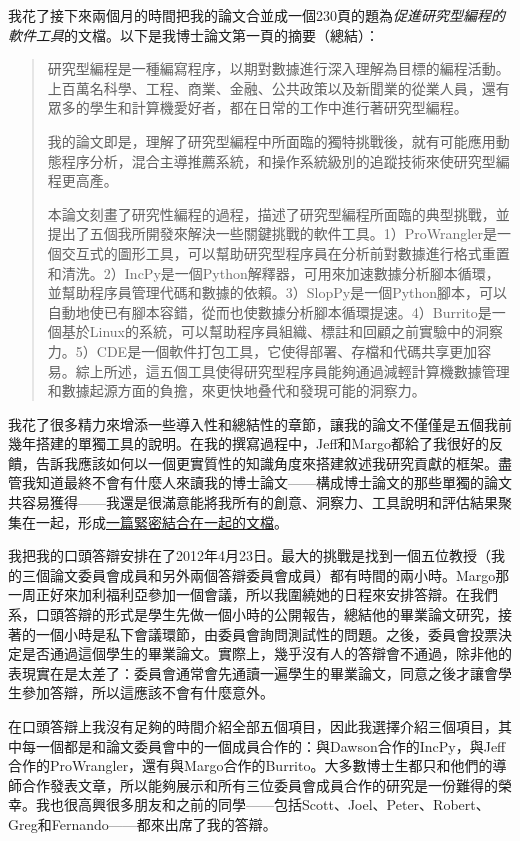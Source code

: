 \documentclass[12pt,UTF8,nofonts]{book}
\begin{document}
我花了接下來兩個月的時間把我的論文合並成一個230頁的題為\emph{促進研究型編程的軟件工具}的文檔。以下是我博士論文第一頁的摘要（總結）：
\begin{quote}
  研究型編程是一種編寫程序，以期對數據進行深入理解為目標的編程活動。上百萬名科學、工程、商業、金融、公共政策以及新聞業的從業人員，還有眾多的學生和計算機愛好者，都在日常的工作中進行著研究型編程。

  我的論文即是，理解了研究型編程中所面臨的獨特挑戰後，就有可能應用動態程序分析，混合主導推薦系統，和操作系統級別的追蹤技術來使研究型編程更高產。

  本論文刻畫了研究性編程的過程，描述了研究型編程所面臨的典型挑戰，並提出了五個我所開發來解決一些關鍵挑戰的軟件工具。1）ProWrangler是一個交互式的圖形工具，可以幫助研究型程序員在分析前對數據進行格式重置和清洗。2）IncPy是一個Python解釋器，可用來加速數據分析腳本循環，並幫助程序員管理代碼和數據的依賴。3）SlopPy是一個Python腳本，可以自動地使已有腳本容錯，從而也使數據分析腳本循環提速。4）Burrito是一個基於Linux的系統，可以幫助程序員組織、標註和回顧之前實驗中的洞察力。5）CDE是一個軟件打包工具，它使得部署、存檔和代碼共享更加容易。綜上所述，這五個工具使得研究型程序員能夠通過減輕計算機數據管理和數據起源方面的負擔，來更快地叠代和發現可能的洞察力。
\end{quote}
我花了很多精力來增添一些導入性和總結性的章節，讓我的論文不僅僅是五個我前幾年搭建的單獨工具的說明。在我的撰寫過程中，Jeff和Margo都給了我很好的反饋，告訴我應該如何以一個更實質性的知識角度來搭建敘述我研究貢獻的框架。盡管我知道最終不會有什麼人來讀我的博士論文——構成博士論文的那些單獨的論文共容易獲得——我還是很滿意能將我所有的創意、洞察力、工具說明和評估結果聚集在一起，形成\href{http://www.pgbovine.net/projects/pubs/guo_phd_dissertation.pdf}{一篇緊密結合在一起的文檔}。

\breakline

我把我的口頭答辯安排在了2012年4月23日。最大的挑戰是找到一個五位教授（我的三個論文委員會成員和另外兩個答辯委員會成員）都有時間的兩小時。Margo那一周正好來加利福利亞參加一個會議，所以我圍繞她的日程來安排答辯。在我們系，口頭答辯的形式是學生先做一個小時的公開報告，總結他的畢業論文研究，接著的一個小時是私下會議環節，由委員會詢問測試性的問題。之後，委員會投票決定是否通過這個學生的畢業論文。實際上，幾乎沒有人的答辯會不通過，除非他的表現實在是太差了：委員會通常會先通讀一遍學生的畢業論文，同意之後才讓會學生參加答辯，所以這應該不會有什麼意外。

在口頭答辯上我沒有足夠的時間介紹全部五個項目，因此我選擇介紹三個項目，其中每一個都是和論文委員會中的一個成員合作的：與Dawson合作的IncPy，與Jeff合作的ProWrangler，還有與Margo合作的Burrito。大多數博士生都只和他們的導師合作發表文章，所以能夠展示和所有三位委員會成員合作的研究是一份難得的榮幸。我也很高興很多朋友和之前的同學——包括Scott、Joel、Peter、Robert、Greg和Fernando——都來出席了我的答辯。
\end{document}
